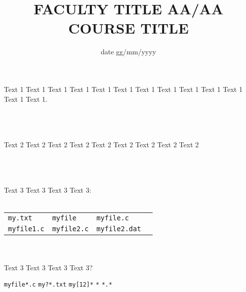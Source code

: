 \documentclass[9pt]{exam}
\title{\vspace{-1em}FACULTY TITLE AA/AA\\\Large{COURSE TITLE}\vspace{-2.4em}}
\date{date gg/mm/yyyy\vspace{-1.5em}}
\begin{document}
\maketitle

\begin{center}
\end{center}


\begin{questions}

\question
    Text 1 Text 1 Text 1 Text 1 Text 1 Text 1 Text 1 Text 1 Text 1 Text 1
    Text 1 Text 1 Text 1.\\\\
    \makebox[0.9\textwidth]{\$ \enspace\hrulefill}\\\\
    \makebox[0.9\textwidth]{\enspace\hrulefill}

\question
    Text 2 Text 2 Text 2 Text 2 Text 2 Text 2 Text 2 Text 2 Text 2\\\\
    \makebox[0.9\textwidth]{\$ \enspace\hrulefill}\\\\
    \makebox[0.9\textwidth]{\enspace\hrulefill}

\question
    Text 3 Text 3 Text 3 Text 3:\\\\
    \begin{tabular}{llll}
        \hline
        \texttt{my.txt} & \texttt{myfile} & \texttt{myfile.c}\\
        \texttt{myfile1.c} & \texttt{myfile2.c} & \texttt{myfile2.dat} \\
        \hline
    \end{tabular}\\\\
    Text 3 Text 3 Text 3 Text 3?
    \begin{checkboxes}
        \choice \texttt{myfile*.c} \quad \makebox[0.6\textwidth]{\$ \enspace\hrulefill}
        \choice \texttt{my?*.txt}  \quad \makebox[0.6\textwidth]{\$ \enspace\hrulefill}
        \choice \texttt{my[12]*}   \quad \makebox[0.6\textwidth]{\$ \enspace\hrulefill}
        \choice \texttt{*}         \quad \makebox[0.6\textwidth]{\$ \enspace\hrulefill}
        \choice \texttt{*.*}       \quad \makebox[0.6\textwidth]{\$ \enspace\hrulefill}
    \end{checkboxes}


\end{questions}
\end{document}

